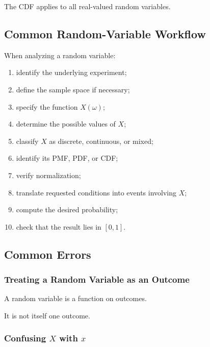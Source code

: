 The CDF applies to all real-valued random variables.

\subsection{Common Random-Variable Workflow}
\label{subsec:random-variable-workflow}

When analyzing a random variable:

\begin{enumerate}
    \item identify the underlying experiment;
    \item define the sample space if necessary;
    \item specify the function \(X(\omega)\);
    \item determine the possible values of \(X\);
    \item classify \(X\) as discrete, continuous, or mixed;
    \item identify its PMF, PDF, or CDF;
    \item verify normalization;
    \item translate requested conditions into events involving \(X\);
    \item compute the desired probability;
    \item check that the result lies in \([0,1]\).
\end{enumerate}

\subsection{Common Errors}
\label{subsec:random-variable-common-errors}

\subsubsection{Treating a Random Variable as an Outcome}

A random variable is a function on outcomes.

It is not itself one outcome.

\subsubsection{Confusing \(X\) with \(x\)}

